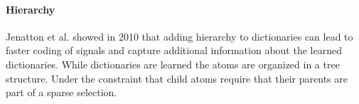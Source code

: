 \paragraph{Hierarchy} Jenatton et al. showed in 2010\cite{Jenatton2010} that
adding hierarchy to dictionaries can lead to faster coding of signals and
capture additional information about the learned dictionaries. While
dictionaries are learned the atoms are organized in a tree structure.
Under the constraint that child atoms require that their parents are part of
a sparse selection. 









